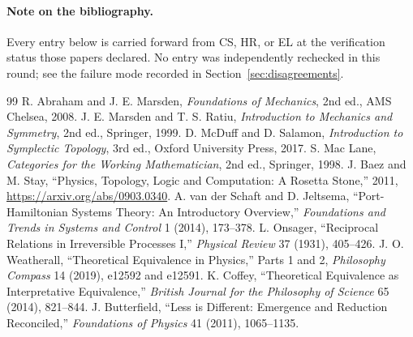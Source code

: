 \documentclass[11pt]{article}
\theoremstyle{plain}
\begin{document}
\paragraph{Note on the bibliography.} Every entry below is carried forward from
CS, HR, or EL at the verification status those papers declared. No entry was
independently rechecked in this round; see the failure mode recorded in
Section~\ref{sec:disagreements}.

{\footnotesize
\setlength{\itemsep}{0pt}
\begin{thebibliography}{99}
\setlength{\itemsep}{0pt}
\setlength{\parskip}{0pt}
 R. Abraham and J. E. Marsden, \emph{Foundations of
Mechanics}, 2nd ed., AMS Chelsea, 2008.
 J. E. Marsden and T. S. Ratiu, \emph{Introduction to
Mechanics and Symmetry}, 2nd ed., Springer, 1999.
 D. McDuff and D. Salamon, \emph{Introduction to
Symplectic Topology}, 3rd ed., Oxford University Press, 2017.
 S. Mac Lane, \emph{Categories for the Working
Mathematician}, 2nd ed., Springer, 1998.
 J. Baez and M. Stay, ``Physics, Topology, Logic and
Computation: A Rosetta Stone,'' 2011, \url{https://arxiv.org/abs/0903.0340}.
 A. van der Schaft and D. Jeltsema, ``Port-Hamiltonian
Systems Theory: An Introductory Overview,'' \emph{Foundations and Trends in
Systems and Control} 1 (2014), 173--378.
 L. Onsager, ``Reciprocal Relations in Irreversible
Processes I,'' \emph{Physical Review} 37 (1931), 405--426.
 J. O. Weatherall, ``Theoretical Equivalence in Physics,''
Parts 1 and 2, \emph{Philosophy Compass} 14 (2019), e12592 and e12591.
 K. Coffey, ``Theoretical Equivalence as Interpretative
Equivalence,'' \emph{British Journal for the Philosophy of Science} 65 (2014),
821--844.
 J. Butterfield, ``Less is Different: Emergence and
Reduction Reconciled,'' \emph{Foundations of Physics} 41 (2011), 1065--1135.
\end{thebibliography}}
\end{document}
